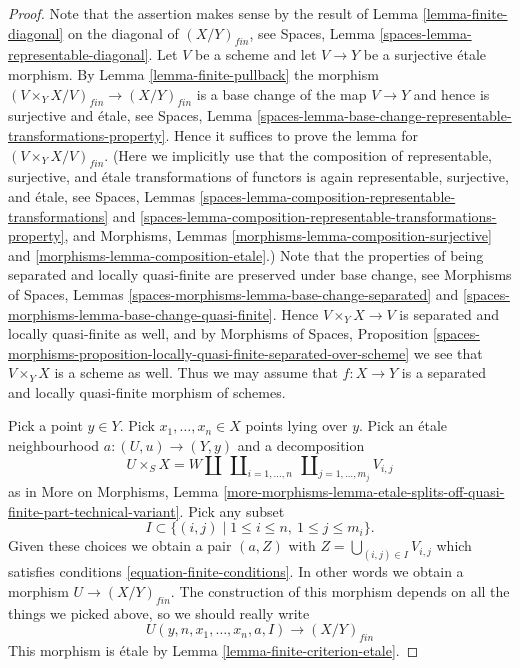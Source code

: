 \begin{proof}
Note that the assertion makes sense by the result of
Lemma \ref{lemma-finite-diagonal}
on the diagonal of $(X/Y)_{fin}$, see
Spaces, Lemma \ref{spaces-lemma-representable-diagonal}.
Let $V$ be a scheme and let $V \to Y$ be a surjective \'etale morphism. By
Lemma \ref{lemma-finite-pullback}
the morphism $(V \times_Y X/V)_{fin} \to (X/Y)_{fin}$ is
a base change of the map $V \to Y$ and hence is surjective and \'etale, see
Spaces,
Lemma \ref{spaces-lemma-base-change-representable-transformations-property}.
Hence it suffices to prove the lemma for $(V \times_Y X/V)_{fin}$.
(Here we implicitly use that the composition of representable, surjective, and
\'etale transformations of functors is again representable, surjective, and
\'etale, see
Spaces, Lemmas \ref{spaces-lemma-composition-representable-transformations} and
\ref{spaces-lemma-composition-representable-transformations-property}, and
Morphisms, Lemmas \ref{morphisms-lemma-composition-surjective} and
\ref{morphisms-lemma-composition-etale}.)
Note that the properties of being separated and locally quasi-finite
are preserved under base change, see
Morphisms of Spaces,
Lemmas \ref{spaces-morphisms-lemma-base-change-separated} and
\ref{spaces-morphisms-lemma-base-change-quasi-finite}.
Hence $V \times_Y X \to V$ is separated and locally quasi-finite as well,
and by
Morphisms of Spaces, Proposition
\ref{spaces-morphisms-proposition-locally-quasi-finite-separated-over-scheme}
we see that $V \times_Y X$ is a scheme as well.
Thus we may assume that $f : X \to Y$ is a separated and locally quasi-finite
morphism of schemes.

\medskip\noindent
Pick a point $y \in Y$. Pick $x_1, \ldots, x_n \in X$ points
lying over $y$. Pick an \'etale neighbourhood $a : (U, u) \to (Y, y)$ and a
decomposition
$$
U \times_S X =
W \amalg
\ \coprod\nolimits_{i = 1, \ldots, n}
\ \coprod\nolimits_{j = 1, \ldots, m_j}
V_{i, j}
$$
as in
More on Morphisms, Lemma
\ref{more-morphisms-lemma-etale-splits-off-quasi-finite-part-technical-variant}.
Pick any subset
$$
I \subset \{(i, j) \mid 1 \leq i \leq n, \ 1 \leq j \leq m_i\}.
$$
Given these choices we obtain a pair $(a, Z)$ with
$Z = \bigcup_{(i, j) \in I} V_{i, j}$
which satisfies conditions \ref{equation-finite-conditions}. In other words
we obtain a morphism $U \to (X/Y)_{fin}$. The construction of this morphism
depends on all the things we picked above, so we should really write
$$
U(y, n, x_1, \ldots, x_n, a, I) \longrightarrow (X/Y)_{fin}
$$
This morphism is \'etale by Lemma \ref{lemma-finite-criterion-etale}.


\end{proof}
